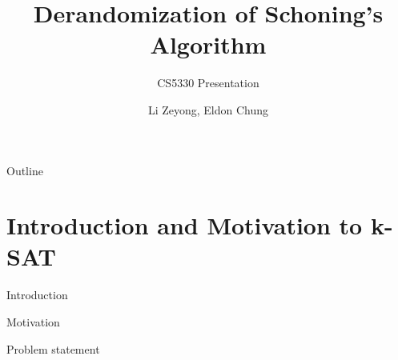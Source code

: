 \documentclass[pdf] {beamer}
\title{Derandomization of Schoning's Algorithm}
\subtitle{CS5330 Presentation}
\author{Li Zeyong, Eldon Chung}
\begin{document}
\begin{frame}
	\titlepage
	
\end{frame}

\begin{frame}{Outline}
	\tableofcontents
\end{frame}

\section{Introduction and Motivation to k-SAT}
	\begin{frame}{Introduction}
		
	\end{frame}
	\begin{frame}{Motivation}
	
	\end{frame}
	\begin{frame}{Problem statement}
	
	\end{frame}
\end{document}
